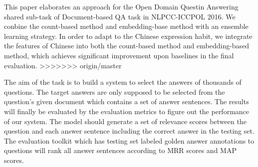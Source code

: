 \documentclass{llncs}
\begin{document}
This paper elaborates an approach for the Open Domain Questin Answering shared sub-task of Document-based QA task in NLPCC-ICCPOL 2016. We conbine the count-based method and embedding-base method with an ensemble learning strategy. In order to adapt to the Chinese expression habit, we integrate the features of Chinese into both the count-based method and embedding-based method, which achieves significant improvement upon baselines in the final evaluation.
>>>>>>> origin/master


The aim of the task is to build a system to select the answers of thousands of questions. The target answers are only supposed to be selected from the question's given document which contains a set of answer sentences. 
The results will finally be evaluated by the evaluation metrics to figure out the performance of our system. 
The model should generate a set of relevance scores between the question and each answer sentence including the correct answer in the testing set. The evaluation toolkit which has testing set labeled golden answer annotations to questions will rank all answer sentences according to MRR scores and MAP scores. 

\end{document}
